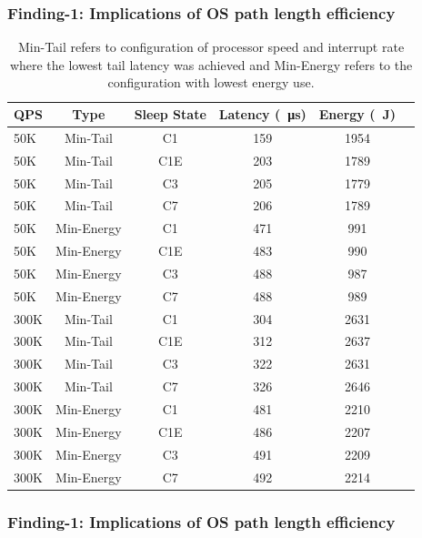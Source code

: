 \subsubsection{Finding-1: Implications of OS path length efficiency}




\begin{table}[t]
\centering
\begin{tabular}{l|c|c|c|c|c|}
  QPS & Type & Sleep State & Latency (\SI{}{\micro s}) & Energy (\SI{}{\joule})\\ \hline
  50K & Min-Tail & C1 & 159 & 1954\\ \hline
  50K & Min-Tail & C1E & 203 & 1789\\ \hline
  50K & Min-Tail & C3 & 205 & 1779\\ \hline
  50K & Min-Tail & C7 & 206 & 1789\\ \hline
  50K & Min-Energy & C1 & 471 & 991\\ \hline
  50K & Min-Energy & C1E & 483 & 990\\ \hline
  50K & Min-Energy & C3 & 488 & 987\\ \hline
  50K & Min-Energy & C7 & 488 & 989\\ \hline
  300K & Min-Tail & C1 & 304 & 2631\\ \hline
  300K & Min-Tail & C1E & 312 & 2637\\ \hline
  300K & Min-Tail & C3 & 322 & 2631\\ \hline
  300K & Min-Tail & C7 & 326 & 2646\\ \hline
  300K & Min-Energy & C1 & 481 & 2210\\ \hline
  300K & Min-Energy & C1E & 486 & 2207\\ \hline
  300K & Min-Energy & C3 & 491 & 2209\\ \hline
  300K & Min-Energy & C7 & 492 & 2214\\ \hline
\end{tabular}
\caption{Min-Tail refers to configuration of processor speed and interrupt rate where the lowest tail latency was achieved and Min-Energy refers to the configuration with lowest energy use.}
\label{table:mcdsilo_sleep_states}	
\end{table}
\subsubsection{Finding-1: Implications of OS path length efficiency}
